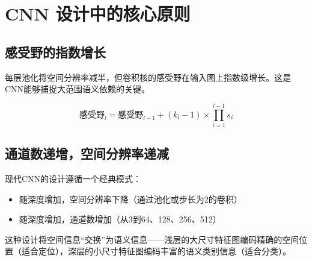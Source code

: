 \section{CNN 设计中的核心原则}

\subsection{感受野的指数增长}

每层池化将空间分辨率减半，但卷积核的感受野在输入图上指数级增长。这是CNN能够捕捉大范围语义依赖的关键。

\[
\text{感受野}_l = \text{感受野}_{l-1} + (k_l - 1) \times \prod_{i=1}^{l-1} s_i
\]

\subsection{通道数递增，空间分辨率递减}

现代CNN的设计遵循一个经典模式：
\begin{itemize}
    \item 随深度增加，空间分辨率下降（通过池化或步长为2的卷积）
    \item 随深度增加，通道数增加（从3到64、128、256、512）
\end{itemize}

这种设计将空间信息``交换''为语义信息——浅层的大尺寸特征图编码精确的空间位置（适合定位），深层的小尺寸特征图编码丰富的语义类别信息（适合分类）。

